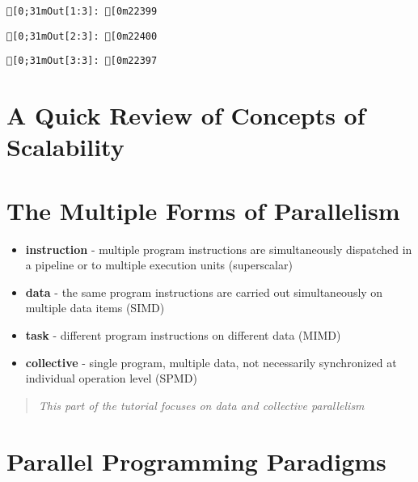 \documentclass{article}
\begin{document}
    
    
    \begin{verbatim}
[0;31mOut[1:3]: [0m22399
    \end{verbatim}

    
    
    \begin{verbatim}
[0;31mOut[2:3]: [0m22400
    \end{verbatim}

    
    
    \begin{verbatim}
[0;31mOut[3:3]: [0m22397
    \end{verbatim}

    
    \section{A Quick Review of Concepts of
Scalability}\label{a-quick-review-of-concepts-of-scalability}

    \section{The Multiple Forms of
Parallelism}\label{the-multiple-forms-of-parallelism}

\begin{itemize}
\itemsep1pt\parskip0pt
\item
  \textbf{instruction} - multiple program instructions are
  simultaneously dispatched in a pipeline or to multiple execution units
  (superscalar)
\item
  \textbf{data} - the same program instructions are carried out
  simultaneously on multiple data items (SIMD)
\item
  \textbf{task} - different program instructions on different data
  (MIMD)
\item
  \textbf{collective} - single program, multiple data, not necessarily
  synchronized at individual operation level (SPMD)
\end{itemize}

    \begin{quote}
\emph{This part of the tutorial focuses on data and collective
parallelism}
\end{quote}

    \section{Parallel Programming
Paradigms}\label{parallel-programming-paradigms}
\end{document}
